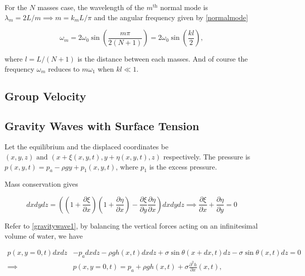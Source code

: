 \documentclass[a4paper,12pt]{report}
\begin{document}
For the \(N\) masses case, the wavelength of the \(m^{\text{th}} \) normal mode is \(\lambda _{m} = 2L /m \implies m = k_{m}L /\pi  \) and the angular frequency given by \cref{normalmode}

\begin{equation}
	\omega _{m} = 2 \omega _{0} \sin \left( \frac{m\pi }{2(N+1)}  \right) =  2 \omega _{0}\sin \left( \frac{kl}{2}  \right),
\end{equation}

where \(l = L /(N+1)\) is the distance between each masses. And of course the frequency \(\omega _{m} \) reduces to \(m \omega _{1} \) when \(kl \ll  1\).    

\subsection{Group Velocity}



\subsection{Gravity Waves with Surface Tension}

Let the equilibrium and the displaced coordinates be \((x,y,z) \text { and } (x+\xi (x,y,t), y+\eta (x,y,t),z)\) respectively. The pressure is \(p(x,y,t) = p_{a} - \rho gy + p_1 (x,y,t)\), where \(p_1 \) is the excess pressure.

Mass conservation gives 

\begin{equation}
	dxdydz = \left( \left( 1+\frac{\partial \xi }{\partial x}  \right) \left( 1+\frac{\partial \eta }{\partial x}  \right) - \frac{\partial \xi }{\partial y} \frac{\partial \eta }{\partial x}   \right)dxdydz \implies \frac{\partial \xi }{\partial x} + \frac{\partial \eta }{\partial y}= 0  
\end{equation}





Refer to \cref{gravitywave1}, by balancing the vertical forces acting on an infinitesimal volume of water, we have


\begin{equation}
	\begin{aligned} 
	p(x,y=0,t) dxdz &- p_{a} dxdz - \rho g h(x,t) dxdz + \sigma \sin \theta (x+dx,t)dz - \sigma \sin \theta (x,t)dz = 0 \\
	\implies &p(x,y=0,t) = p_{a} + \rho g h(x,t) + \sigma \frac{\partial^2 h}{\partial x} (x,t),
	\end{aligned} 
\end{equation}
\end{document}
